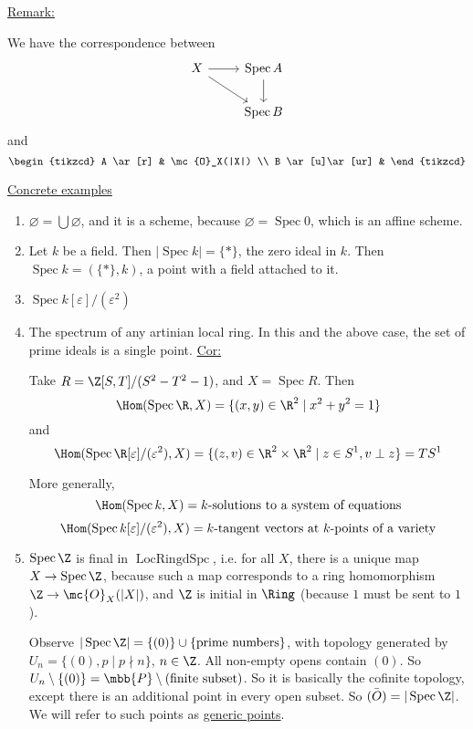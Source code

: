 \documentclass[x11names,reqno,14pt]{extarticle}
\DeclareMathOperator{\Spec}{Spec}
\DeclareMathOperator{\LRS}{LocRingdSpc}
\begin{document}
\underline{Remark:}

We have the correspondence between
\[
\begin{tikzcd}
X \ar[r] \ar[dr] & \Spec A \ar[d] \\
& \Spec B
\end{tikzcd}
\]
and
\[
\begin{tikzcd}
A \ar[r] & \mc{O}_X(|X|) \\
B \ar[u]\ar[ur] &
\end{tikzcd}
\]

\underline{Concrete examples}

\begin{enumerate}

\item $\varnothing = \bigcup \varnothing$, and it is a scheme, because $\varnothing = \Spec 0$, which is an affine scheme.

\item Let $k$ be a field. Then $|\Spec k| = \{*\}$, the zero ideal in $k$. Then $\Spec k = (\{*\}, k)$, a point with a field attached to it. 

\item $\Spec k[\varepsilon]/(\varepsilon^2)$ 

\item The spectrum of any artinian local ring. In this and the above case, the set of prime ideals is a single point. 
\underline{Cor:} 

Take $R = \Z[S,T]/(S^2 - T^2 - 1)$, and $X = \Spec R$. Then
\[
\Hom(\Spec \R, X) = \{(x,y) \in \R^2 \mid x^2 + y^2 = 1\}
\]
and
\[
\Hom(\Spec\R[\varepsilon]/(\varepsilon^2), X) = \{(z,v) \in \R^2\times \R^2 \mid z \in S^1, v \perp z\} = TS^1
\]

More generally, 
\[
\Hom(\Spec k, X) = k\text{-solutions to a system of equations}
\]
\[
\Hom(\Spec k[\varepsilon]/(\varepsilon^2), X) = k\text{-tangent vectors at $k$-points of a variety}
\]

\item $\Spec\Z$ is final in $\LRS$, i.e. for all $X$, there is a unique map $X \to \Spec \Z$, because such a map corresponds to a ring homomorphism $\Z \to \mc{O}_X(|X|)$, and $\Z$ is initial in $\Ring$ (because $1$ must be sent to $1$). 

Observe $|\Spec \Z| = \{(0)\} \cup \{\text{prime numbers}\}$, with topology generated by $U_n = \{(0), p \mid p\nmid n\}$, $n \in \Z$. All non-empty opens contain $(0)$. So $U_n\setminus\{(0)\} = \mbb{P}\setminus(\text{finite subset})$. So it is basically the cofinite topology, except there is an additional point in every open subset. So $\bar{(O)} = |\Spec\Z|$. We will refer to such points as \underline{generic points}. 


\end{enumerate}
\end{document}
